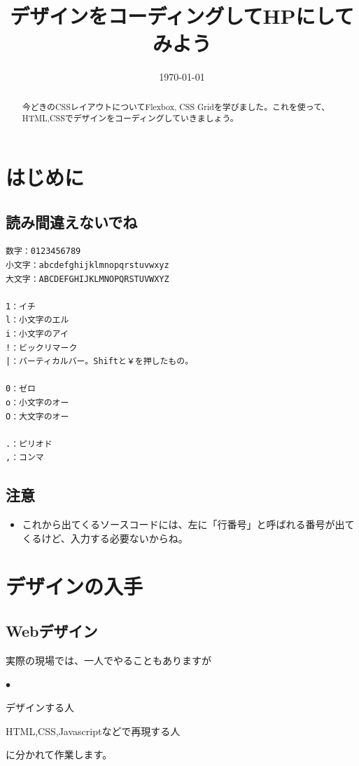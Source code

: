 \documentclass[mingoth,11pt,a4j,uplatex,dvipdfmx]{jsarticle}
\title{デザインをコーディングしてHPにしてみよう}
\date{\today}
\renewenvironment{description}%
{%
   \begin{list}{\parbox{1zw}{$\bullet$}}%
   {%
      \setlength{\topsep}{1zh}
      \setlength{\itemindent}{3zw}
      \setlength{\leftmargin}{5zw}%
      \setlength{\rightmargin}{0zw}%
      \setlength{\labelsep}{1zw}%
      \setlength{\labelwidth}{3zw}%
      \setlength{\itemsep}{0em}%
      \setlength{\parsep}{0em}%
      \setlength{\listparindent}{0zw}%
   }
}{%
   \end{list}%
}
\begin{document}

\maketitle

\begin{abstract}
今どきのCSSレイアウトについてFlexbox, CSS Gridを学びました。これを使って、HTML,CSSでデザインをコーディングしていきましょう。
\end{abstract}

\tableofcontents
\newpage

\section{はじめに}
\subsection{読み間違えないでね}

\begin{lstlisting}[caption=読み間違えないでね]
数字：0123456789
小文字：abcdefghijklmnopqrstuvwxyz
大文字：ABCDEFGHIJKLMNOPQRSTUVWXYZ

1：イチ
l：小文字のエル
i：小文字のアイ
!：ビックリマーク
|：バーティカルバー。Shiftと￥を押したもの。

0：ゼロ
o：小文字のオー
O：大文字のオー

.：ピリオド
,：コンマ
\end{lstlisting}

\subsection{注意}
\begin{itemize}
\item これから出てくるソースコードには、左に「行番号」と呼ばれる番号が出てくるけど、入力する必要ないからね。
\end{itemize}



\section{デザインの入手}
\subsection{Webデザイン}
実際の現場では、一人でやることもありますが
\begin{description}
\item[Webデザイナー] デザインする人
\item[Webコーダー] HTML,CSS,Javascriptなどで再現する人
\end{description}
に分かれて作業します。
\end{document}
